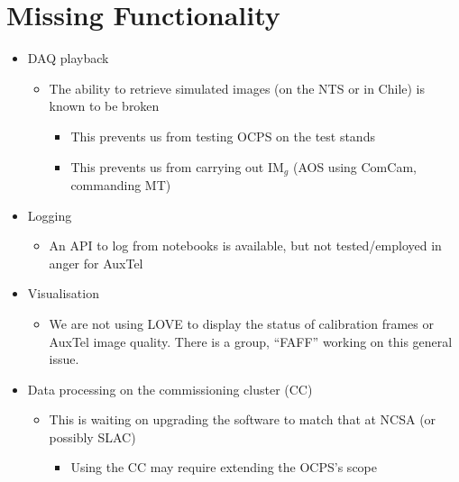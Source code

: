 \documentclass[SE,authoryear,toc]{lsstdoc}
\begin{document}
\section{Missing Functionality}

\begin{itemize}
    \item DAQ playback
    \begin{itemize}
    \item The ability to retrieve simulated images (on the NTS or in Chile) is known to be broken
      \begin{itemize}
      \item This prevents us from testing OCPS on the test stands
      \item This prevents us from carrying out IM$_{g}$ (AOS using ComCam, commanding MT)
      \end{itemize}
    \end{itemize}

  \item Logging
    \begin{itemize}
    \item An API to log from notebooks is available, but not tested/employed in anger for AuxTel
    \end{itemize}

  \item Visualisation
    \begin{itemize}
    \item We are not using LOVE to display \eg the status of calibration frames or AuxTel image quality.
      There is a group, ``FAFF'' working on this general issue.
    \end{itemize}
    
  \item Data processing on the commissioning cluster (CC)
    \begin{itemize}
    \item This is waiting on upgrading the software to match that at NCSA (or possibly SLAC)
      \begin{itemize}
      \item Using the CC may require extending the OCPS's scope
      \end{itemize}
    \end{itemize}
\end{itemize}
\end{document}
